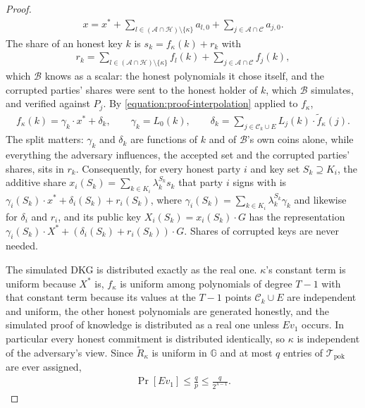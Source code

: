 \documentclass{article}
\theoremstyle{plain}
\theoremstyle{definition}
\theoremstyle{remark}
\begin{document}
\begin{proof}
  \begin{align}\label{equation:proof-key}
    x = x^* + \sum_{l \in (\mathcal{A} \cap \mathcal{H}) \setminus \{\kappa\}} a_{l,0} + \sum_{j \in \mathcal{A} \cap \mathcal{C}} a_{j,0}.
  \end{align}
  The share of an honest key $k$ is $s_k = f_\kappa(k) + r_k$ with
  \begin{align}\label{equation:proof-rest}
    r_k = \sum_{l \in (\mathcal{A} \cap \mathcal{H}) \setminus \{\kappa\}} f_l(k) + \sum_{j \in \mathcal{A} \cap \mathcal{C}} f_j(k),
  \end{align}
  which $\mathcal{B}$ knows as a scalar: the honest polynomials it chose itself, and the corrupted parties' shares were sent to the honest holder of $k$, which $\mathcal{B}$ simulates, and verified against $P_j$.  By \eqref{equation:proof-interpolation} applied to $f_\kappa$,
  \begin{align}\label{equation:proof-share-affine}
    f_\kappa(k) = \gamma_k \cdot x^* + \delta_k, \qquad \gamma_k = L_0(k), \qquad \delta_k = \sum_{j \in \mathcal{C}_k \cup E} L_j(k) \cdot \tilde{f}_\kappa(j).
  \end{align}
  The split matters: $\gamma_k$ and $\delta_k$ are functions of $k$ and of $\mathcal{B}$'s own coins alone, while everything the adversary influences, the accepted set and the corrupted parties' shares, sits in $r_k$.  Consequently, for every honest party $i$ and key set $S_k \supseteq K_i$, the additive share $x_i(S_k) = \sum_{k \in K_i} \lambda^{S_k}_k s_k$ that party $i$ signs with is $\gamma_i(S_k) \cdot x^* + \delta_i(S_k) + r_i(S_k)$, where $\gamma_i(S_k) = \sum_{k \in K_i} \lambda^{S_k}_k \gamma_k$ and likewise for $\delta_i$ and $r_i$, and its public key $X_i(S_k) = x_i(S_k) \cdot G$ has the representation $\gamma_i(S_k) \cdot X^* + (\delta_i(S_k) + r_i(S_k)) \cdot G$.  Shares of corrupted keys are never needed.

  The simulated DKG is distributed exactly as the real one.  $\kappa$'s constant term is uniform because $X^*$ is, $f_\kappa$ is uniform among polynomials of degree $T-1$ with that constant term because its values at the $T-1$ points $\mathcal{C}_k \cup E$ are independent and uniform, the other honest polynomials are generated honestly, and the simulated proof of knowledge is distributed as a real one unless $\mathit{Ev}_1$ occurs.  In particular every honest commitment is distributed identically, so $\kappa$ is independent of the adversary's view.  Since $\tilde{R}_\kappa$ is uniform in $\mathbb{G}$ and at most $q$ entries of $\mathcal{T}_{\mathrm{pok}}$ are ever assigned,
  \begin{align}\label{equation:proof-ev1}
    \Pr[\mathit{Ev}_1] \le \frac{q}{p} \le \frac{q}{2^{\lambda - 1}}.
  \end{align}


\end{proof}
\end{document}
